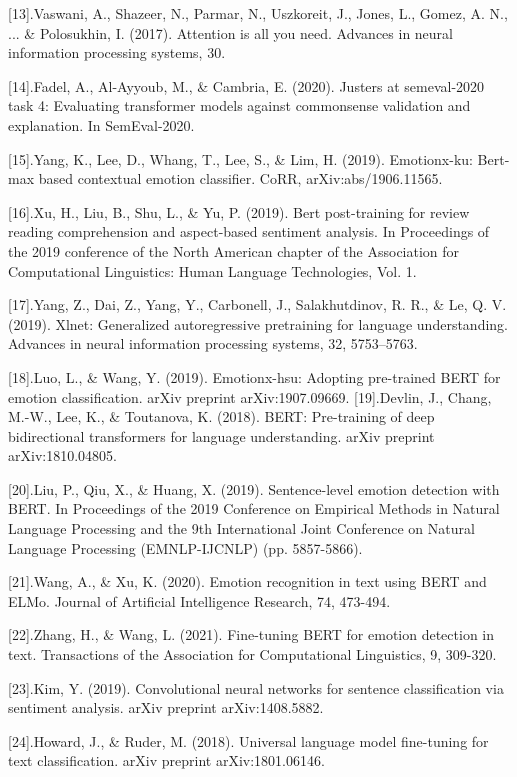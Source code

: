 \documentclass[journal]{IEEEtran}
\begin{document}
[13].Vaswani, A., Shazeer, N., Parmar, N., Uszkoreit, J., Jones, L., Gomez, A. N., ... & Polosukhin, I. (2017). Attention is all you need. Advances in neural information processing systems, 30. 

[14].Fadel, A., Al-Ayyoub, M., & Cambria, E. (2020). Justers at semeval-2020 task 4: Evaluating transformer models against commonsense validation and explanation. In SemEval-2020. 

[15].Yang, K., Lee, D., Whang, T., Lee, S., & Lim, H. (2019). Emotionx-ku: Bert-max based contextual emotion classifier. CoRR, arXiv:abs/1906.11565. 

[16].Xu, H., Liu, B., Shu, L., & Yu, P. (2019). Bert post-training for review reading comprehension and aspect-based sentiment analysis. In Proceedings of the 2019 conference of the North American chapter of the Association for Computational Linguistics: Human Language Technologies, Vol. 1. 

[17].Yang, Z., Dai, Z., Yang, Y., Carbonell, J., Salakhutdinov, R. R., & Le, Q. V. (2019). Xlnet: Generalized autoregressive pretraining for language understanding. Advances in neural information processing systems, 32, 5753–5763. 

[18].Luo, L., & Wang, Y. (2019). Emotionx-hsu: Adopting pre-trained BERT for emotion classification. arXiv preprint arXiv:1907.09669. 
[19].Devlin, J., Chang, M.-W., Lee, K., & Toutanova, K. (2018). BERT: Pre-training of deep bidirectional transformers for language understanding. arXiv preprint arXiv:1810.04805.

[20].Liu, P., Qiu, X., & Huang, X. (2019). Sentence-level emotion detection with BERT. In Proceedings of the 2019 Conference on Empirical Methods in Natural Language Processing and the 9th International Joint Conference on Natural Language Processing (EMNLP-IJCNLP) (pp. 5857-5866).

[21].Wang, A., & Xu, K. (2020). Emotion recognition in text using BERT and ELMo. Journal of Artificial Intelligence Research, 74, 473-494.

[22].Zhang, H., & Wang, L. (2021). Fine-tuning BERT for emotion detection in text. Transactions of the Association for Computational Linguistics, 9, 309-320.

[23].Kim, Y. (2019). Convolutional neural networks for sentence classification via sentiment analysis. arXiv preprint arXiv:1408.5882.

[24].Howard, J., & Ruder, M. (2018). Universal language model fine-tuning for text classification. arXiv preprint arXiv:1801.06146.
\end{document}
